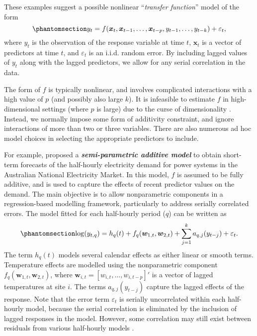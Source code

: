 \documentclass[
  11pt,
  a4paper,
]{article}
\begin{document}
These examples suggest a possible nonlinear ``\emph{transfer function}''
model of the form \begin{equation}\phantomsection\label{eq-transferfun}{
 y_t = f(\bm{x}_{t}, \bm{x}_{t-1}, \dots,\bm{x}_{t-p}, y_{t-1},\dots,y_{t-k}) + \varepsilon_{t},
}\end{equation} where \(y_{t}\) is the observation of the response
variable at time \(t\), \(\bm{x}_{t}\) is a vector of predictors at time
\(t\), and \(\varepsilon_{t}\) is an i.i.d. random error. By including
lagged values of \(y_{t}\) along with the lagged predictors, we allow
for any serial correlation in the data.

The form of \(f\) is typically nonlinear, and involves complicated
interactions with a high value of \(p\) (and possibly also large \(k\)).
It is infeasible to estimate \(f\) in high-dimensional settings (where
\(p\) is large) due to the curse of dimensionality
\autocite{Bellman57,Stone82}. Instead, we normally impose some form of
additivity constraint, and ignore interactions of more than two or three
variables. There are also numerous ad hoc model choices in selecting the
appropriate predictors to include.

For example, \textcite{FH2012} proposed a \textbf{\emph{semi-parametric
additive model}} to obtain short-term forecasts of the half-hourly
electricity demand for power systems in the Australian National
Electricity Market. In this model, \(f\) is assumed to be fully
additive, and is used to capture the effects of recent predictor values
on the demand. The main objective is to allow nonparametric components
in a regression-based modelling framework, particularly to address
serially correlated errors. The model fitted for each half-hourly period
(\(q\)) can be written as \begin{equation}\phantomsection\label{eq-FH}{
 \log(y_{t,q}) = h_{q}(t) + f_{q}(\bm{w}_{1,t},\bm{w}_{2,t}) + \sum_{j=1}^k a_{q,j}(y_{t-j}) + \varepsilon_{t}.
}\end{equation} The term \(h_{q}(t)\) models several calendar effects as
either linear or smooth terms. Temperature effects are modelled using
the nonparametric component \(f_{q}(\bm{w}_{1,t},\bm{w}_{2,t})\), where
\(\bm{w}_{i,t} = [w_{i,t},\dots,w_{i,t-p}]'\) is a vector of lagged
temperatures at site \(i\). The terms \(a_{q,j}(y_{t-j})\) capture the
lagged effects of the response. Note that the error term
\(\varepsilon_{t}\) is serially uncorrelated within each half-hourly
model, because the serial correlation is eliminated by the inclusion of
lagged responses in the model. However, some correlation may still exist
between residuals from various half-hourly models \autocite{FH2012}.
\end{document}
